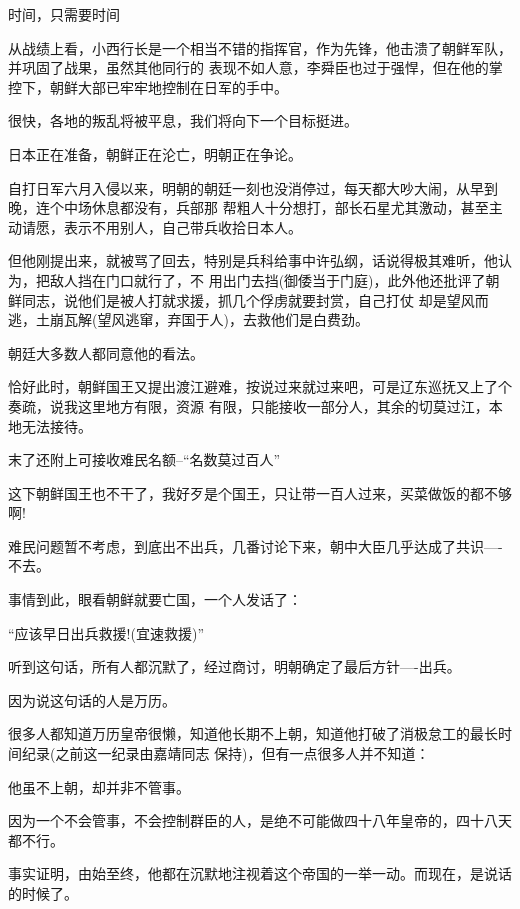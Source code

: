\documentclass[11pt,a4paper,onecolumn]{article}
\begin{document}
时间，只需要时间

从战绩上看，小西行长是一个相当不错的指挥官，作为先锋，他击溃了朝鲜军队，并巩固了战果，虽然其他同行的
表现不如人意，李舜臣也过于强悍，但在他的掌控下，朝鲜大部已牢牢地控制在日军的手中。

很快，各地的叛乱将被平息，我们将向下一个目标挺进。

日本正在准备，朝鲜正在沦亡，明朝正在争论。

自打日军六月入侵以来，明朝的朝廷一刻也没消停过，每天都大吵大闹，从早到晚，连个中场休息都没有，兵部那
帮粗人十分想打，部长石星尤其激动，甚至主动请愿，表示不用别人，自己带兵收拾日本人。

但他刚提出来，就被骂了回去，特别是兵科给事中许弘纲，话说得极其难听，他认为，把敌人挡在门口就行了，不
用出门去挡(御倭当于门庭)，此外他还批评了朝鲜同志，说他们是被人打就求援，抓几个俘虏就要封赏，自己打仗
却是望风而逃，土崩瓦解(望风逃窜，弃国于人)，去救他们是白费劲。

朝廷大多数人都同意他的看法。

恰好此时，朝鲜国王又提出渡江避难，按说过来就过来吧，可是辽东巡抚又上了个奏疏，说我这里地方有限，资源
有限，只能接收一部分人，其余的切莫过江，本地无法接待。

末了还附上可接收难民名额--``名数莫过百人''

这下朝鲜国王也不干了，我好歹是个国王，只让带一百人过来，买菜做饭的都不够啊!

难民问题暂不考虑，到底出不出兵，几番讨论下来，朝中大臣几乎达成了共识----不去。

事情到此，眼看朝鲜就要亡国，一个人发话了：

``应该早日出兵救援!(宜速救援)''

听到这句话，所有人都沉默了，经过商讨，明朝确定了最后方针----出兵。

因为说这句话的人是万历。

很多人都知道万历皇帝很懒，知道他长期不上朝，知道他打破了消极怠工的最长时间纪录(之前这一纪录由嘉靖同志
保持)，但有一点很多人并不知道：

他虽不上朝，却并非不管事。

因为一个不会管事，不会控制群臣的人，是绝不可能做四十八年皇帝的，四十八天都不行。

事实证明，由始至终，他都在沉默地注视着这个帝国的一举一动。而现在，是说话的时候了。

\section[\thesection]{}
\end{document}
